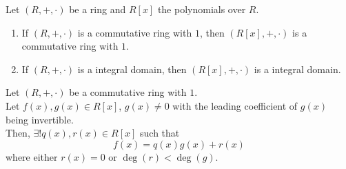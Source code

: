\documentclass{report}
\begin{document}
		\begin{thm} \label{thm_ring_polynomial_relationship}
			Let $(R,+,\cdot)$ be a ring and $R[x]$ the polynomials over $R$.
			\begin{enumerate}
				\item If $(R,+,\cdot)$ is a commutative ring with $1$, then $(R[x],+,\cdot)$ is a commutative ring with $1$.
				\item If $(R,+,\cdot)$ is a integral domain, then $(R[x],+,\cdot)$ is a integral domain.
			\end{enumerate}
		\end{thm}

		\begin{thm} \label{thm_polynomial_division_algorithm_ring}
			Let $(R,+,\cdot)$ be a commutative ring with $1$.\\
			Let $f(x),g(x) \in R[x]$, $g(x) \ne 0$ with the leading coefficient of $g(x)$ being invertible.\\
			Then, $\exists! q(x),r(x) \in R[x]$ such that
			\begin{displaymath}
				f(x)=q(x)g(x)+r(x)
			\end{displaymath}
			where either $r(x)=0$ or $\deg(r)<\deg(g)$.
		\end{thm}
\end{document}
